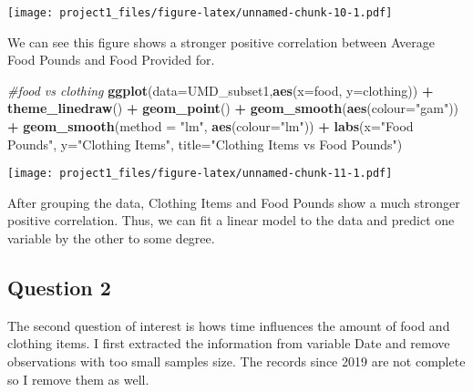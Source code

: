\documentclass[]{article}
\newenvironment{Shaded}{\begin{snugshade}}{\end{snugshade}}
\newcommand{\CommentTok}[1]{\textcolor[rgb]{0.56,0.35,0.01}{\textit{#1}}}
\newcommand{\DataTypeTok}[1]{\textcolor[rgb]{0.13,0.29,0.53}{#1}}
\newcommand{\KeywordTok}[1]{\textcolor[rgb]{0.13,0.29,0.53}{\textbf{#1}}}
\newcommand{\NormalTok}[1]{#1}
\newcommand{\OperatorTok}[1]{\textcolor[rgb]{0.81,0.36,0.00}{\textbf{#1}}}
\newcommand{\StringTok}[1]{\textcolor[rgb]{0.31,0.60,0.02}{#1}}
\begin{document}
\texttt{[image: project1\_files/figure-latex/unnamed-chunk-10-1.pdf]}

We can see this figure shows a stronger positive correlation between
Average Food Pounds and Food Provided for.

\begin{Shaded}
\begin{Highlighting}[]
\CommentTok{#food vs clothing}
\KeywordTok{ggplot}\NormalTok{(}\DataTypeTok{data=}\NormalTok{UMD_subset1,}\KeywordTok{aes}\NormalTok{(}\DataTypeTok{x=}\NormalTok{food, }\DataTypeTok{y=}\NormalTok{clothing)) }\OperatorTok{+}
\StringTok{  }\KeywordTok{theme_linedraw}\NormalTok{() }\OperatorTok{+}
\StringTok{  }\KeywordTok{geom_point}\NormalTok{() }\OperatorTok{+}
\StringTok{  }\KeywordTok{geom_smooth}\NormalTok{(}\KeywordTok{aes}\NormalTok{(}\DataTypeTok{colour=}\StringTok{"gam"}\NormalTok{)) }\OperatorTok{+}
\StringTok{  }\KeywordTok{geom_smooth}\NormalTok{(}\DataTypeTok{method =} \StringTok{"lm"}\NormalTok{, }\KeywordTok{aes}\NormalTok{(}\DataTypeTok{colour=}\StringTok{"lm"}\NormalTok{)) }\OperatorTok{+}
\StringTok{  }\KeywordTok{labs}\NormalTok{(}\DataTypeTok{x=}\StringTok{"Food Pounds"}\NormalTok{,}
       \DataTypeTok{y=}\StringTok{"Clothing Items"}\NormalTok{,}
       \DataTypeTok{title=}\StringTok{"Clothing Items vs Food Pounds"}\NormalTok{)}
\end{Highlighting}
\end{Shaded}

\texttt{[image: project1\_files/figure-latex/unnamed-chunk-11-1.pdf]}

After grouping the data, Clothing Items and Food Pounds show a much
stronger positive correlation. Thus, we can fit a linear model to the
data and predict one variable by the other to some degree.

\hypertarget{question-2}{%
\subsection{Question 2}\label{question-2}}

The second question of interest is hows time influences the amount of
food and clothing items. I first extracted the information from variable
Date and remove observations with too small samples size. The records
since 2019 are not complete so I remove them as well.
\end{document}

